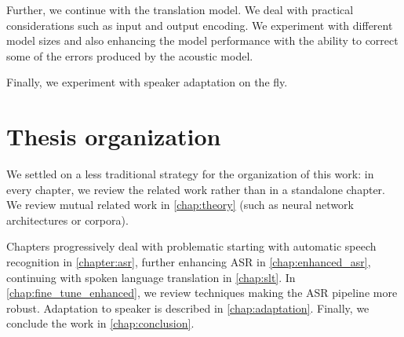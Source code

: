 Further, we continue with the translation model. We deal with practical considerations such as input and output encoding. We experiment with different model sizes and also enhancing the model performance with the ability to correct some of the errors produced by the acoustic model.

Finally, we experiment with speaker adaptation on the fly. 

\section*{Thesis organization}
We settled on a less traditional strategy for the organization of this work: in every chapter, we review the related work rather than in a standalone chapter. We review mutual related work in \cref{chap:theory} (such as neural network architectures or corpora).

Chapters progressively deal with problematic starting with automatic speech recognition in \cref{chapter:asr}, further enhancing ASR in \cref{chap:enhanced_asr}, continuing with spoken language translation in \cref{chap:slt}. In \cref{chap:fine_tune_enhanced}, we review techniques making the ASR pipeline more robust. Adaptation to speaker is described in \cref{chap:adaptation}. Finally, we conclude the work in \cref{chap:conclusion}.
